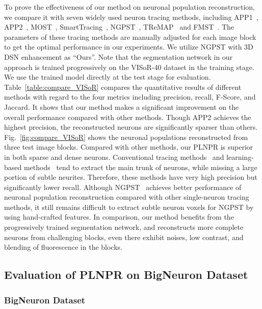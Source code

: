 To prove the effectiveness of our method on neuronal population reconstruction, we compare it with seven widely used neuron tracing methods, including APP1~\cite{Peng2011},  APP2~\cite{Xiao2013}, MOST~\cite{Wu2014}, SmartTracing~\cite{Chen2015}, NGPST~\cite{Quan2015}, TReMAP~\cite{Zhou2016} and  FMST~\cite{Yang2019}.
The parameters of these tracing methods are manually adjusted for each image block to get the optimal performance in our experiments.
%
We utilize NGPST with 3D DSN enhancement as ``Ours''. Note that the segmentation network in our approach is trained progressively on the VISoR-40 dataset in the training stage. We use the trained model directly at the test stage for evaluation. 
%
Table~\ref{table:compare_VISoR} compares the quantitative results of different methods with regard to the four metrics including precision, recall, F-Score, and Jaccard.
%
It shows that our method makes a significant improvement on the overall performance compared with other methods.
Though APP2 achieves the highest precision, the reconstructed neurons are significantly sparser than others. 
%
Fig.~\ref{fig:compare_VISoR} shows the neuronal populations reconstructed from three test image blocks.
Compared with other methods, our PLNPR is superior in both sparse and dense neurons.
Conventional tracing methods~\cite{Peng2011, Xiao2013, Wu2014, Zhou2016} and learning-based methods~\cite{Chen2015, Yang2019} tend to extract the main trunk of neurons, while missing a large portion of subtle neurites. 
Therefore, these methods have very high precision but significantly lower recall.
Although NGPST~\cite{Quan2015} achieves better performance of neuronal population reconstruction compared with other single-neuron tracing methods, it still remains difficult to extract subtle neuron voxels for NGPST by using hand-crafted features.
%
In comparison, our method benefits from the progressively trained segmentation network, and reconstructs more complete neurons from challenging blocks, even there exhibit noises, low contrast, and blending of fluorescence in the blocks.


\subsection{Evaluation of PLNPR on BigNeuron Dataset}
\label{sec:exp_PLNPR_BigNeuron}

\subsubsection{BigNeuron Dataset}

